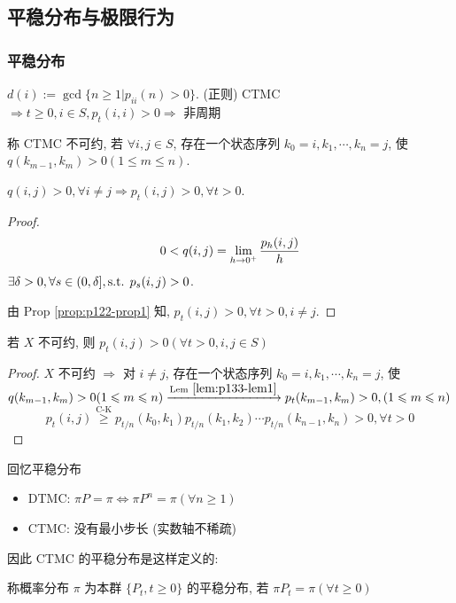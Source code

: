 \subsection{平稳分布与极限行为}

\subsubsection{平稳分布}

$d(i):=\gcd\{n\geq 1|p_{ii}(n)>0\}$. (正则) CTMC $\Rightarrow t\geq 0,i\in S,p_t(i,i)>0\Rightarrow$ 非周期

\begin{definition}[不可约]
    称 CTMC 不可约, 若 $\forall i,j\in S$, 存在一个状态序列 $k_0=i,k_1,\cdots,k_n=j$, 使 $q(k_{m-1},k_m)>0(1\leq m\leq n)$.
\end{definition}

\begin{lemma}\label{lem:p133-lem1}
    $q(i,j)>0,\forall i\neq j\Rightarrow p_t(i,j)>0,\forall t>0$.
\end{lemma}

\begin{proof}
    \[
    0<q(i,j)=\limitto{h}{0^+}\frac{p_h(i,j)}{h}
    \]
    $\exists \delta>0,\forall s\in (0,\delta],\stt p_s(i,j)>0$. 

    由 Prop \ref{prop:p122-prop1} 知, $p_t(i,j)>0,\forall t>0,i\neq j$.
\end{proof}

\begin{lemma}
    若 $X$ 不可约, 则 $p_t(i,j)>0 (\forall t>0,i,j\in S)$
\end{lemma}

\begin{proof}
    $X$ 不可约 $\Rightarrow$ 对 $i\neq j$, 存在一个状态序列 $k_0=i,k_1,\cdots,k_n=j$, 使 $q(k_{m-1},k_m)>0(1\leq m\leq n)\xrightarrow{\text{Lem}\ \ref{lem:p133-lem1}} p_t(k_{m-1},k_m)>0, (1\leq m\leq n)$
    \[
    p_t(i,j)\overset{\text{C-K}}{\geq } p_{t/n}(k_0,k_1)p_{t/n}(k_1,k_2)\cdots p_{t/n}(k_{n-1},k_n)>0,\forall t>0
    \]
\end{proof}

回忆平稳分布
\begin{itemize}
    \item DTMC: $\pi P=\pi\iff \pi P^n=\pi(\forall n\geq 1)$
    \item CTMC: 没有最小步长 (实数轴不稀疏)
\end{itemize}
因此 CTMC 的平稳分布是这样定义的:

\begin{definition}[平稳分布]
    称概率分布 $\pi$ 为本群 $\{P_t,t\geq 0\}$ 的平稳分布, 若 $\pi P_t=\pi(\forall t\geq 0)$ 
\end{definition}

